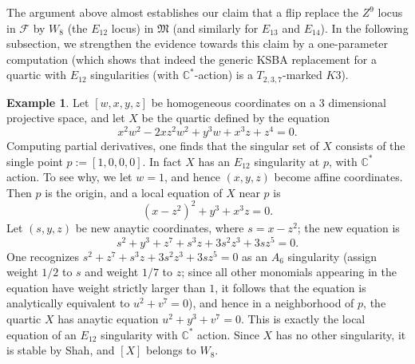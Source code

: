 \documentclass[11pt]{amsart}
\numberwithin{equation}{section}
\theoremstyle{plain}
\theoremstyle{remark}
\theoremstyle{definition}
\newtheorem{example}[theorem]{Example}
\newcommand{\cF}{\mathscr{F}}
\newcommand{\CC}{{\mathbb C}}
\newcommand{\gM}{\mathfrak{M}}
\begin{document}
The argument above almost establishes our claim that a flip replace the $Z^9$ locus in $\cF$  by $W_8$ (the $E_{12}$ locus) in $\gM$ (and similarly for $E_{13}$ and $E_{14}$). In the following subsection, we strengthen the evidence towards this claim by a one-parameter computation (which shows that indeed the generic KSBA replacement for a quartic with $E_{12}$ singularities (with $\CC^{*}$-action) is a $T_{2,3,7}$-marked $K3$). 

\begin{example} 
%
Let $[w,x,y,z]$ be homogeneous coordinates on a $3$ dimensional projective space, and let $X$ be the quartic defined by the equation
%
\begin{equation*}
%
x^2w^2-2xz^2w^2+y^3w+x^3z+z^4=0.
%
\end{equation*}
%
Computing partial derivatives, one finds that the singular set of $X$ consists of the single point $p:=[1,0,0,0]$.  In fact $X$ has an $E_{12}$ singularity at $p$, with $\CC^{*}$ action. To see why, we let $w=1$, and hence $(x,y,z)$ become affine coordinates. Then $p$ is the origin, and a local equation of $X$ near $p$ is
%
\begin{equation*}
%
(x-z^2)^2+y^3+x^3z=0.
%
\end{equation*}
%
Let  $(s,y,z)$ be new anaytic  coordinates, where $s=x-z^2$; the new equation is
%
\begin{equation*}
%
s^2+y^3+z^7+s^3z+3s^2 z^3+3sz^5=0.
%
\end{equation*}
%
One recognizes $s^2+z^7+s^3z+3s^2 z^3+3sz^5=0$ as an $A_6$ singularity (assign weight $1/2$ to $s$ and weight $1/7$ to $z$; since all other monomials appearing in the equation have weight strictly larger than $1$, it follows that the equation is analytically equivalent to $u^2+v^7=0$), and hence in a neighborhood of $p$, the quartic $X$ has anaytic equation $u^2+y^3+v^7=0$. This is exactly the local equation of an $E_{12}$ singularity with $\CC^{*}$ action. Since $X$ has no other singularity, it is stable by Shah, and $[X]$ belongs to $W_8$. 
%
\end{example}
%
\end{document}

